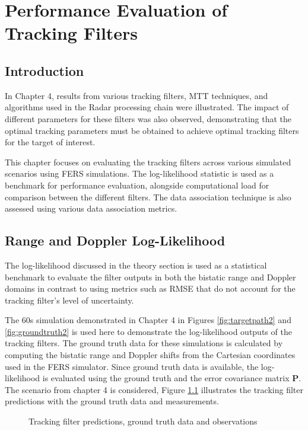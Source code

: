 \newpage
\chapter{Performance Evaluation of Tracking Filters}
\section{Introduction}
In Chapter 4, results from various tracking filters, \ac{MTT} techniques, and algorithms used in the \ac{Radar} processing chain were illustrated. The impact of different parameters for these filters was also observed, demonstrating that the optimal tracking parameters must be obtained to achieve optimal tracking filters for the target of interest.

This chapter focuses on evaluating the tracking filters across various simulated scenarios using \ac{FERS} simulations. The log-likelihood statistic is used as a benchmark for performance evaluation, alongside computational load for comparison between the different filters. The data association technique is also assessed using various data association metrics. 

\section{Range and Doppler Log-Likelihood}
 The log-likelihood discussed in the theory section is used as a statistical benchmark to evaluate the filter outputs in both the bistatic range and Doppler domains in contrast to using metrics such as \ac{RMSE} that do not account for the tracking filter's level of uncertainty.

The 60s simulation demonstrated in Chapter 4 in Figures \ref{fig:targetpath2} and \ref{fig:groundtruth2} is used here to demonstrate the log-likelihood outputs of the tracking filters. The ground truth data for these simulations is calculated by computing the bistatic range and Doppler shifts from the Cartesian coordinates used in the \ac{FERS} simulator. Since ground truth data is available, the log-likelihood is evaluated using the ground truth and the error covariance matrix \( \mathbf{P} \). The scenario from chapter 4 is considered, Figure \ref{fig:simpleScenarioOutput} illustrates the tracking filter predictions with the ground truth data and measurements.

\begin{figure}[H]
    \centering
    
    \caption{Tracking filter predictions, ground truth data and observations}
    \label{fig:simpleScenarioOutput}
\end{figure}

